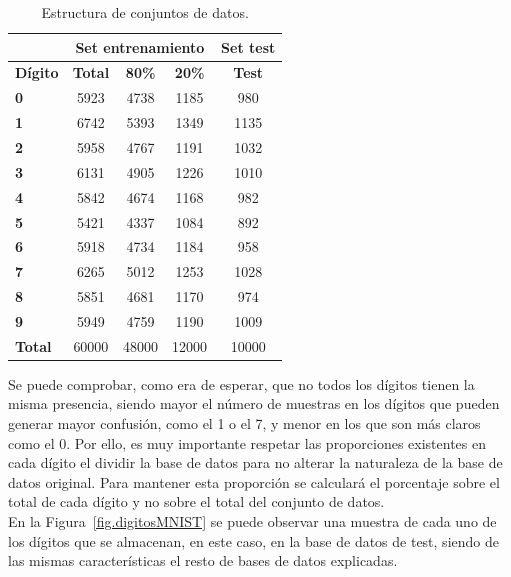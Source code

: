 \begin{table}[H]
	\centering
	\begin{tabular}{l|c|c|c|c|}
		\cline{2-5}
		& \multicolumn{3}{|c|}{\textbf{Set entrenamiento}} & \textbf{Set test} \\
		\hline
		\multicolumn{1}{|l|}{\textbf{Dígito}} & \textbf{Total} & \textbf{80\%} & \textbf{20\%} & \textbf{Test}\\
		\hline 
		\multicolumn{1}{|l|}{\textbf{0}} & 5923 & 4738 & 1185 & 980\\ \hline
		\multicolumn{1}{|l|}{\textbf{1}} & 6742 & 5393 & 1349 & 1135\\ \hline
		\multicolumn{1}{|l|}{\textbf{2}} & 5958 & 4767 & 1191 & 1032\\ \hline
		\multicolumn{1}{|l|}{\textbf{3}} & 6131 & 4905 & 1226 & 1010\\ \hline
		\multicolumn{1}{|l|}{\textbf{4}} & 5842 & 4674 & 1168 & 982\\ \hline
		\multicolumn{1}{|l|}{\textbf{5}} & 5421 & 4337 & 1084 & 892\\ \hline
		\multicolumn{1}{|l|}{\textbf{6}} & 5918 & 4734 & 1184 & 958\\ \hline
		\multicolumn{1}{|l|}{\textbf{7}} & 6265 & 5012 & 1253 & 1028\\ \hline
		\multicolumn{1}{|l|}{\textbf{8}} & 5851 & 4681 & 1170 & 974\\ \hline
		\multicolumn{1}{|l|}{\textbf{9}} & 5949 & 4759 & 1190 & 1009\\ \hline
		\multicolumn{1}{|l|}{\textbf{Total}} & 60000 & 48000 & 12000 & 10000\\ \hline
	\end{tabular}
	\caption{Estructura de conjuntos de datos.}
	\label{tab.baseDatos}
\end{table}

Se puede comprobar, como era de esperar, que no todos los dígitos tienen la misma presencia, siendo mayor el número de muestras en los dígitos que pueden generar mayor confusión, como el 1 o el 7, y menor en los que son más claros como el 0. Por ello, es muy importante respetar las proporciones existentes en cada dígito el dividir la base de datos para no alterar la naturaleza de la base de datos original. Para mantener esta proporción se calculará el porcentaje sobre el total de cada dígito y no sobre el total del conjunto de datos.\\

En la Figura~\ref{fig.digitosMNIST} se puede observar una muestra de cada uno de los dígitos que se almacenan, en este caso, en la base de datos de test, siendo de las mismas características el resto de bases de datos explicadas.

